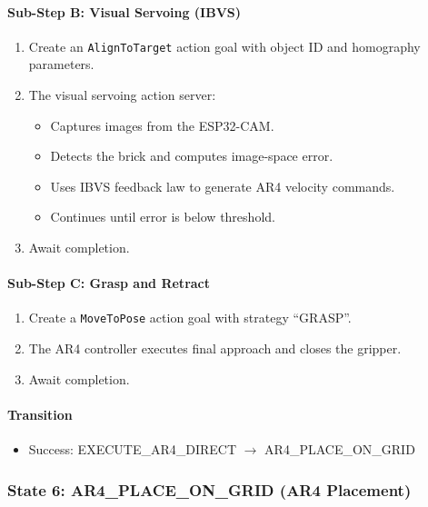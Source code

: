 \paragraph{Sub-Step B: Visual Servoing (IBVS)}

\begin{enumerate}
    \item Create an \texttt{AlignToTarget} action goal with object ID and homography parameters.
    \item The visual servoing action server:
    \begin{itemize}
        \item Captures images from the ESP32-CAM.
        \item Detects the brick and computes image-space error.
        \item Uses IBVS feedback law to generate AR4 velocity commands.
        \item Continues until error is below threshold.
    \end{itemize}
    \item Await completion.
\end{enumerate}

\paragraph{Sub-Step C: Grasp and Retract}

\begin{enumerate}
    \item Create a \texttt{MoveToPose} action goal with strategy ``GRASP''.
    \item The AR4 controller executes final approach and closes the gripper.
    \item Await completion.
\end{enumerate}

\paragraph{Transition}

\begin{itemize}
    \item Success: EXECUTE\_AR4\_DIRECT $\rightarrow$ AR4\_PLACE\_ON\_GRID
\end{itemize}

\subsubsection{State 6: AR4\_PLACE\_ON\_GRID (AR4 Placement)}
\label{state:ar4place}

